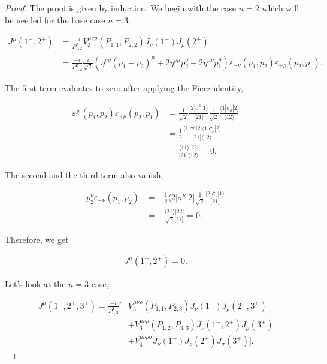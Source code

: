 \documentclass{article}
\theoremstyle{definition}
\numberwithin{equation}{section}
\begin{document}
\begin{proof}

    The proof is given by induction. We begin with the case $n=2$ which will be needed for the base case $n=3$:

    \begin{align*}
        J^{\mu}(1^{-}, 2^{+}) &= \frac{-i}{P_{1,2}^2} V_3^{\mu \nu \rho}(P_{1,1}, P_{2,2}) J_{\nu}(1^{-}) J_{\rho}(2^{+}) \\
        &= \frac{-i}{P_{1,2}^2} \frac{i}{\sqrt{2}} \left( \eta^{\nu \rho} \left( p_1 - p_2 \right)^{\mu}  + 2\eta^{\rho \mu}p_2^{\nu} -2\eta^{\mu \nu}p_1^{\rho} \right) \varepsilon_{-\nu}(p_1,p_2) \varepsilon_{+\rho}(p_2,p_1).
    \end{align*}

    The first term evaluates to zero after applying the Fierz identity,

    \begin{align*}
        \varepsilon_{-}^{\rho}(p_1,p_2) \varepsilon_{+\rho}(p_2,p_1) &= \frac{1}{\sqrt{2}} \frac{ \lbrack 2 | \overline{\sigma}^{\rho} | 1 \rangle }{ \lbrack 21 \rbrack } \frac{1}{\sqrt{2}} \frac{ \langle 1 | \sigma_{\rho} | 2 \rbrack }{ \langle 12 \rangle } \\
        &= \frac{1}{2} \frac{ \langle 1 | \sigma^{\rho} | 2 \rbrack \langle 1 | \sigma_{\rho} | 2 \rbrack }{ \lbrack 21 \rbrack \langle 12 \rangle } \\
        &= \frac{ \langle 11 \rangle \lbrack 22 \rbrack }{ \lbrack 21 \rbrack \langle 12 \rangle } = 0.
    \end{align*}

    The second and the third term also vanish,

    \begin{align*}
        p_2^{\nu} \varepsilon_{-\nu}(p_1,p_2) &= - \frac{1}{2} \langle 2 | \sigma^{\nu} | 2 \rbrack \frac{1}{\sqrt{2}} \frac{ \lbrack 2 | \overline{\sigma}_{\nu} | 1 \rangle }{ \lbrack 21 \rbrack } \\
        &= - \frac{ \langle 21 \rangle \lbrack 22 \rbrack }{\sqrt{2} \lbrack 21 \rbrack } = 0.
    \end{align*}

    Therefore, we get

    \begin{align}
        J^{\mu}(1^{-}, 2^{+}) = 0. \label{eq:caseneq2}
    \end{align}

    Let's look at the $n=3$ case,

    \begin{align*}
        J^{\mu}(1^{-}, 2^{+}, 3^{+}) = \frac{-i}{P_{1,3}^2} \Biggl[ &V_3^{\mu \nu \rho}(P_{1,1}, P_{2,3}) J_{\nu}(1^{-}) J_{\rho}(2^{+}, 3^{+}) \\
        &+V_3^{\mu \nu \rho}(P_{1,2}, P_{3,3}) J_{\nu}(1^{-}, 2^{+}) J_{\rho}(3^{+}) \\
        &+V_4^{\mu \nu \rho \sigma} J_{\nu}(1^{-}) J_{\rho}(2^{+}) J_{\sigma}(3^{+}) \Biggr].
    \end{align*}


\end{proof}
\end{document}
